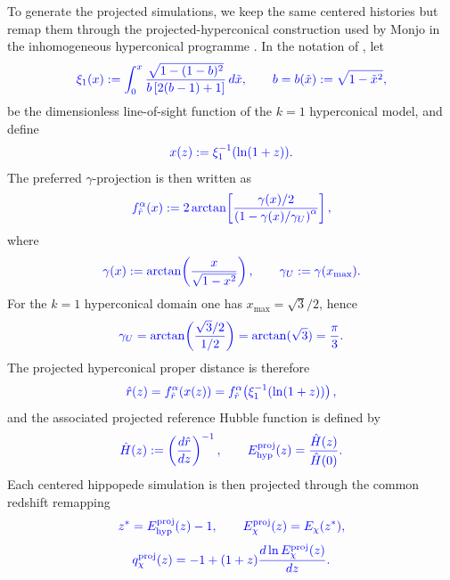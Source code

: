 \documentclass[11pt]{article}
\newcommand{\blue}[1]{{\color{blue}#1}}
\begin{document}
\blue{To generate the projected simulations, we keep the same centered histories but remap them through the projected-hyperconical construction used by Monjo in the inhomogeneous hyperconical programme \cite{monjo2017hyperconical, monjo2018projected, monjo2020lagrangian, monjo2023hubble, Monjo_2024}. In the notation of \cite{monjo2018projected}, let}
\begin{equation}
\blue{
\xi_1(x):=\int_{0}^{x}\frac{\sqrt{1-(1-b)^2}}{b\left[2(b-1)+1\right]}\,d\tilde x,
\qquad
b=b(\tilde x):=\sqrt{1-\tilde x^2},
}
\end{equation}
\blue{be the dimensionless line-of-sight function of the $k=1$ hyperconical model, and define}
\begin{equation}
\blue{
x(z):=\xi_1^{-1}(\ln(1+z)).
}
\end{equation}
\blue{The preferred $\gamma$-projection is then written as}
\begin{equation}
\label{eq:projection_map}
\blue{
f_{\hat r}^{\alpha}(x):=
2\arctan\!\left[
\frac{\gamma(x)/2}{\left(1-\gamma(x)/\gamma_U\right)^\alpha}
\right],
}
\end{equation}
\blue{where}
\begin{equation}
\blue{
\gamma(x):=\arctan\!\left(\frac{x}{\sqrt{1-x^2}}\right)
,
\qquad \gamma_U:=\gamma(x_{\max}).
}
\end{equation}
\blue{For the $k=1$ hyperconical domain one has $x_{\max}=\sqrt{3}/2$, hence}
\begin{equation}
\blue{
\gamma_U=\arctan\!\left(\frac{\sqrt{3}/2}{1/2}\right)=\arctan(\sqrt{3})=\frac{\pi}{3}.
}
\end{equation}
\blue{The projected hyperconical proper distance is therefore}
\begin{equation}
\blue{
\hat r(z)= f_{\hat r}^{\alpha}\!\left(x(z)\right)
= f_{\hat r}^{\alpha}\!\left(\xi_1^{-1}(\ln(1+z))\right),
}
\end{equation}
\blue{and the associated projected reference Hubble function is defined by}
\begin{equation}
\blue{
\hat H(z):=\left(\frac{d\hat r}{dz}\right)^{-1},
\qquad
E_{\mathrm{hyp}}^{\mathrm{proj}}(z)=\frac{\hat H(z)}{\hat H(0)}.
}
\end{equation}
\blue{Each centered hippopede simulation is then projected through the common redshift remapping}
\begin{equation}
\blue{
z^*=E_{\mathrm{hyp}}^{\mathrm{proj}}(z)-1,
\qquad
E^{\mathrm{proj}}_\chi(z)=E_\chi(z^*),
}
\end{equation}
\begin{equation}
\blue{
q^{\mathrm{proj}}_\chi(z)=-1+(1+z)\frac{d\ln E^{\mathrm{proj}}_\chi(z)}{dz}.
}
\end{equation}
\end{document}
